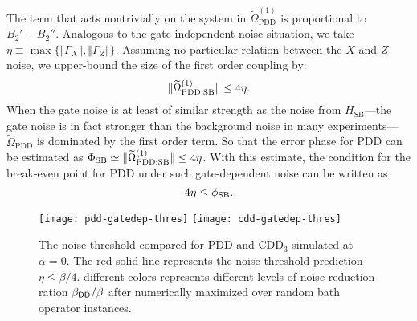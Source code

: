 \documentclass[b5paper,11pt]{article}
\newcommand{\ep}{\Phi_\mathrm{SB}}
\begin{document}
The term that acts nontrivially on the system in $\widetilde \Omega_\mathrm{PDD}^{(1)}$ is proportional to $B_2'-B_2''$. Analogous to the gate-independent noise situation, we take $\eta\equiv \max\{\Vert \Gamma_X\Vert,\Vert \Gamma_Z\Vert\}$. Assuming no particular relation between the $X$ and $Z$ noise,  we upper-bound the size of the first order coupling by:
\begin{equation}\label{eq:gatedep-upperbound}
\Vert { \widetilde{\Omega}_\mathrm{PDD:SB}^{(1)} } \Vert \le 4 \eta.
\end{equation}
When the gate noise is at least of similar strength as the noise from $H_\mathrm{SB}$---the gate noise is in fact stronger than the background noise in many experiments---$\widetilde{\Omega}_\mathrm{PDD}$ is dominated by the first order term. So that the error phase for PDD can be estimated as $\ep\simeq \norm{ \widetilde{\Omega}_\mathrm{PDD:SB}^{(1)} } \leq 4\eta$.
With this estimate, the condition for the break-even point for PDD under such gate-dependent noise can be written as 
\begin{equation}
4\eta\leq\phi_{\mathrm{SB}}.
\end{equation}

 \begin{figure}
\texttt{[image: pdd-gatedep-thres]}\quad
\texttt{[image: cdd-gatedep-thres]}
\caption{The noise threshold compared for PDD and $\mathrm{CDD}_3$ simulated at $\alpha=0$. The red solid line represents the noise threshold prediction $\eta\le\beta/4$. different colors represents different levels of noise reduction ration $\beta_{\mathsf{DD}}/\beta$ after numerically maximized over random bath operator instances.
\label{fig:cdd-gatedep-thres}}
\end{figure}

\end{document}
